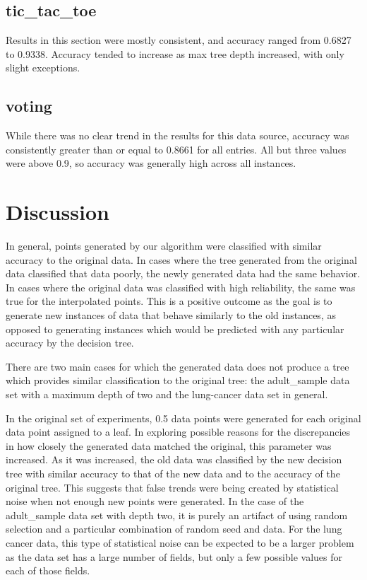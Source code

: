 \documentclass{sig-alternate}
\begin{document}
\subsection{tic\_tac\_toe}
Results in this section were mostly consistent, and accuracy ranged from 0.6827 to 0.9338. Accuracy tended to increase as max tree depth increased, with only slight exceptions.
\subsection{voting}
While there was no clear trend in the results for this data source, accuracy was consistently greater than or equal to 0.8661 for all entries. All but three values were above 0.9, so accuracy was generally high across all instances.

\section{Discussion}
In general, points generated by our algorithm were classified with similar accuracy to the original data. In cases where the tree generated from the original data classified that data poorly, the newly generated data had the same behavior. In cases where the original data was classified with high reliability, the same was true for the interpolated points. This is a positive outcome as the goal is to generate new instances of data that behave similarly to the old instances, as opposed to generating instances which would be predicted with any particular accuracy by the decision tree.

There are two main cases for which the generated data does not produce a tree which provides similar classification to the original tree: the adult\_sample data set with a maximum depth of two and the lung-cancer data set in general.

In the original set of experiments, 0.5 data points were generated for each original data point assigned to a leaf. In exploring possible reasons for the discrepancies in how closely the generated data matched the original, this parameter was increased. As it was increased, the old data was classified by the new decision tree with similar accuracy to that of the new data and to the accuracy of the original tree. This suggests that false trends were being created by statistical noise when not enough new points were generated. In the case of the adult\_sample data set with depth two, it is purely an artifact of using random selection and a particular combination of random seed and data. For the lung cancer data, this type of statistical noise can be expected to be a larger problem as the data set has a large number of fields, but only a few possible values for each of those fields.
\end{document}
